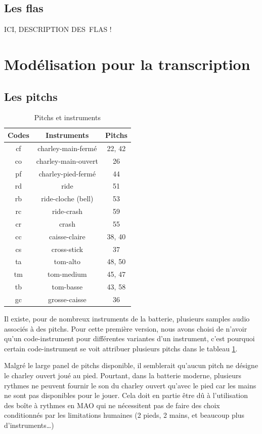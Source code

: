 \subsection*{Les flas}
ICI, DESCRIPTION DES FLAS !
\section{Modélisation pour la transcription}
\label{modelisation_transcription}
\subsection*{Les pitchs}
\begin{table}[h]
	\centering
	\begin{tabular}{|c|c|c|} \hline
		Codes & Instruments & Pitchs \\ \hline
		cf & charley-main-fermé & 22, 42 \\
		co & charley-main-ouvert & 26 \\
		pf & charley-pied-fermé & 44 \\
		rd & ride & 51 \\
		rb & ride-cloche (bell) & 53 \\
		rc & ride-crash & 59 \\
		cr & crash & 55 \\
		cc & caisse-claire & 38, 40 \\
		cs & cross-stick & 37 \\
		ta & tom-alto & 48, 50 \\
		tm & tom-medium & 45, 47 \\
		tb & tom-basse & 43, 58 \\
		gc & grosse-caisse & 36 \\ \hline
	\end{tabular}
	\caption{Pitchs et instruments}
	\label{pitchs_instru}
\end{table}

Il existe, pour de nombreux instruments de la batterie, plusieurs samples audio associés à des pitchs. 
Pour cette première version, nous avons choisi de n’avoir qu’un code-instrument pour différentes variantes d’un instrument, c’est pourquoi certain code-instrument se voit attribuer plusieurs pitchs dans le tableau \ref{pitchs_instru}.

Malgré le large panel de pitchs disponible, il semblerait qu’aucun pitch ne désigne le charley ouvert joué au pied. Pourtant, dans la batterie moderne, plusieurs rythmes ne peuvent fournir le son du charley ouvert qu’avec le pied car les mains ne sont pas disponibles pour le jouer. Cela doit en partie être dû à l’utilisation des boîte à rythmes en MAO qui ne nécessitent pas de faire des choix conditionnés par les limitations humaines (2 pieds, 2 mains, et beaucoup plus d’instruments…)



